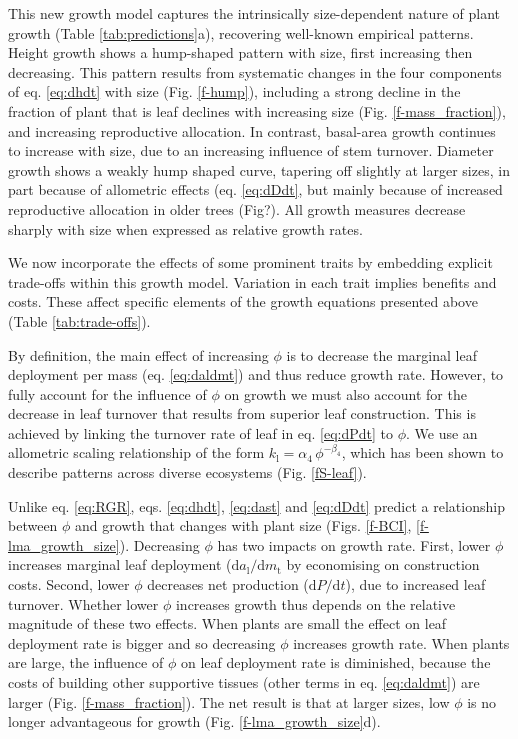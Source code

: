 \documentclass[12pt, a4paper]{article}
\begin{document}
This new growth model captures the intrinsically size-dependent nature
of plant growth (Table \ref{tab:predictions}a), recovering well-known
empirical patterns\citep{sillett_increasing_2010, king_size-related_2011}. Height growth shows a hump-shaped pattern
with size, first increasing then decreasing. This pattern results from
systematic changes in the four components of eq. \ref{eq:dhdt} with size
(Fig. \ref{f-hump}), including a strong decline in the fraction of plant
that is leaf declines with increasing size (Fig. \ref{f-mass_fraction}),
and increasing reproductive allocation. In contrast, basal-area growth
continues to increase with size\citep{sillett_increasing_2010,
@stephenson_rate_2014}, due to an increasing influence of stem
turnover. Diameter growth shows a weakly hump shaped
curve\citep{herault_functional_2011}, tapering off slightly at larger
sizes, in part because of allometric effects (eq. \ref{eq:dDdt}, but
mainly because of increased reproductive allocation in older trees
(Fig?). All growth measures decrease sharply with size when expressed as
relative growth rates\citep{iida_linking_2014}.

We now incorporate the effects of some prominent traits by embedding
explicit trade-offs within this growth model. Variation in each trait
implies benefits and costs. These affect specific elements of the growth
equations presented above (Table \ref{tab:trade-offs}).

By definition, the main effect of increasing \(\phi\) is to decrease the
marginal leaf deployment per mass (eq. \ref{eq:daldmt}) and thus reduce
growth rate. However, to fully account for the influence of \(\phi\) on
growth we must also account for the decrease in leaf turnover that
results from superior leaf construction\citep{wright_world_wide_2004}.
This is achieved by linking the turnover rate of leaf in eq.
\ref{eq:dPdt} to \(\phi\). We use an allometric scaling relationship of
the form \(k_\textrm{l}=\alpha_4 \, \phi^{-\beta_4}\), which has been
shown to describe patterns across diverse
ecosystems\citep{wright_world_wide_2004} (Fig. \ref{fS-leaf}).

Unlike eq. \ref{eq:RGR}, eqs. \ref{eq:dhdt}, \ref{eq:dast} and
\ref{eq:dDdt} predict a relationship between \(\phi\) and growth that
changes with plant size (Figs. \ref{f-BCI}, \ref{f-lma_growth_size}).
Decreasing \(\phi\) has two impacts on growth rate. First, lower
\(\phi\) increases marginal leaf deployment
(\(\textrm{d}a_\textrm{l} / \textrm{d}m_\textrm{t}\) by economising on
construction costs. Second, lower \(\phi\) decreases net production
(\(\textrm{d}P / \textrm{d}t\)), due to increased leaf turnover. Whether
lower \(\phi\) increases growth thus depends on the relative magnitude
of these two effects. When plants are small the effect on leaf
deployment rate is bigger and so decreasing \(\phi\) increases growth
rate. When plants are large, the influence of \(\phi\) on leaf
deployment rate is diminished, because the costs of building other
supportive tissues (other terms in eq. \ref{eq:daldmt}) are larger (Fig.
\ref{f-mass_fraction}). The net result is that at larger sizes, low
\(\phi\) is no longer advantageous for growth (Fig.
\ref{f-lma_growth_size}d).
\end{document}
